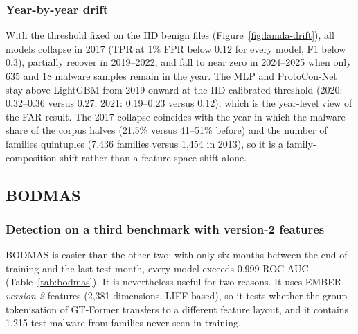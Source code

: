 \documentclass[fleqn,10pt]{wlscirep}
\newcommand{\gtf}{GT\mbox{-}Former}
\newcommand{\lgbm}{LightGBM}
\begin{document}
\subsubsection{Year-by-year drift}
With the threshold fixed on the IID benign files (Figure~\ref{fig:lamda-drift}), all models collapse in 2017 (TPR at 1\% FPR below 0.12 for every model, F1 below 0.3), partially recover in 2019--2022, and fall to near zero in 2024--2025 when only 635 and 18 malware samples remain in the year. The MLP and ProtoCon-Net stay above \lgbm{} from 2019 onward at the IID-calibrated threshold (2020: 0.32--0.36 versus 0.27; 2021: 0.19--0.23 versus 0.12), which is the year-level view of the FAR result. The 2017 collapse coincides with the year in which the malware share of the corpus halves (21.5\% versus 41--51\% before) and the number of families quintuples (7,436 families versus 1,454 in 2013), so it is a family-composition shift rather than a feature-space shift alone.

\subsection{BODMAS}
\label{sec:bodmas}

\subsubsection{Detection on a third benchmark with version-2 features}
BODMAS is easier than the other two: with only six months between the end of training and the last test month, every model exceeds 0.999 ROC-AUC (Table~\ref{tab:bodmas}). It is nevertheless useful for two reasons. It uses EMBER \emph{version-2} features (2,381 dimensions, LIEF-based), so it tests whether the group tokenisation of \gtf{} transfers to a different feature layout, and it contains 1,215 test malware from families never seen in training.
\end{document}
